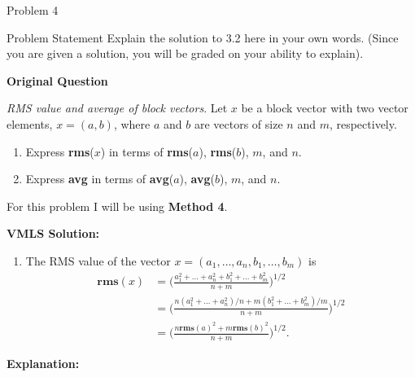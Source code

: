 \begin{problem}{Problem 4}
    \begin{statement}{Problem Statement}
        Explain the solution to 3.2 here in your own words. (Since you are given a solution, you will be graded on your ability to explain). \vspace*{1em}

        \textbf{Original Question} \vspace*{1em}

        \textit{RMS value and average of block vectors}. Let $x$ be a block vector with two vector elements, $x = (a,b)$, where $a$ and $b$ are vectors of size $n$ and $m$, respectively.

        \begin{enumerate}[label=(\alph*)]
            \item Express \textbf{rms}($x$) in terms of \textbf{rms}($a$), \textbf{rms}($b$), $m$, and $n$.
            \item Express \textbf{avg} in terms of \textbf{avg}($a$), \textbf{avg}($b$), $m$, and $n$.
        \end{enumerate}
    \end{statement}

    \begin{Highlight}
        For this problem I will be using \textbf{Method 4}. \vspace*{1em}

        \textbf{VMLS Solution:}

        \begin{enumerate}[label=(\alph*)]
            \item The RMS value of the vector $x = (a_{1}, \dots, a_{n}, b_{1}, \dots, b_{m})$ is 
            \begin{align*}
                \mathbf{rms}(x) & = \Bigg(\frac{a^{2}_{1} + \dots + a^{2}_{n} + b^{2}_{1} + \dots + b^{2}_{m}}{n + m}\Bigg)^{1/2} \\
                & = \Bigg(\frac{n(a^{2}_{1} + \dots + a^{2}_{n})/n + m(b^{2}_{1} + \dots + b^{2}_{m})/m}{n+m} \Bigg)^{1/2} \\
                & = \Bigg(\frac{n\mathbf{rms}(a)^{2} + m\mathbf{rms}(b)^{2}}{n+m} \Bigg)^{1/2}.
            \end{align*}
        \end{enumerate}

        \textbf{Explanation:} \vspace*{1em}


\end{Highlight}
\end{problem}
